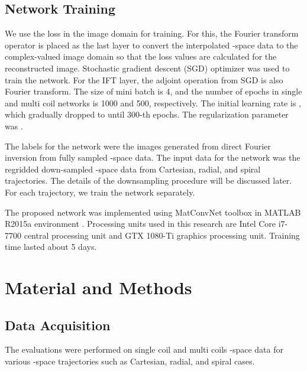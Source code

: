 \documentclass[10pt,journal]{IEEEtran}
\newcommand{\0}{{\boldsymbol{0}}}
\begin{document}
\subsection{Network Training}

We use the  loss  in the image domain  for training. For this, 
the Fourier transform operator is placed as the last layer to convert the interpolated -space data to
the complex-valued image domain so that  the loss values are calculated for the reconstructed image.
Stochastic gradient descent (SGD) optimizer was used to train the network. For the IFT layer, the adjoint operation from SGD is also Fourier transform.
The size of mini batch is 4, and the number of epochs in single and multi coil networks is 1000 and 500, respectively. The initial learning rate is , which gradually dropped to  until 300-th epochs. The regularization parameter was . 


The labels for the network were the images generated from direct Fourier inversion from
fully sampled -space data. The input data for the network was the regridded down-sampled -space data from Cartesian, radial, and spiral trajectories.
The details of the downsampling procedure will be discussed later.
 For each trajectory, we train the network separately. 



The proposed network was implemented using MatConvNet toolbox in MATLAB R2015a environment \cite{vedaldi2015matconvnet}. 
Processing units used in this research are Intel Core i7-7700 central processing unit and GTX 1080-Ti graphics processing unit. Training time lasted about 5 days.
 


\section{Material and Methods}

\subsection{Data Acquisition}

The evaluations were performed on single coil and multi coils -space data for various -space trajectories
 such as Cartesian, radial, and spiral cases. 
\end{document}
